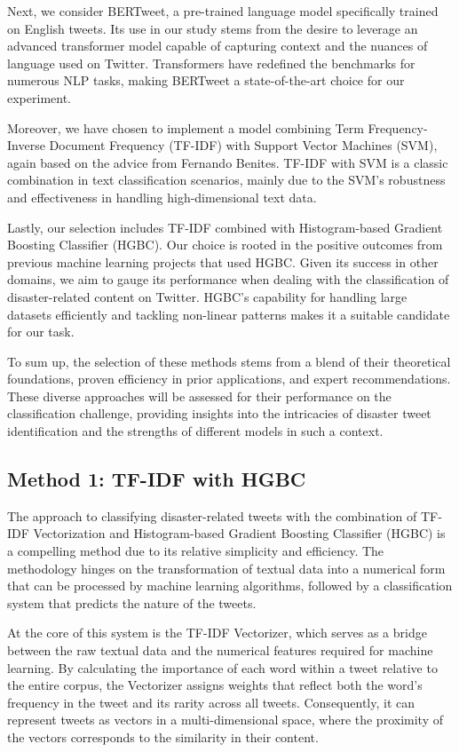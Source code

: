 \documentclass[10pt,table]{article}
\begin{document}
Next, we consider BERTweet, a pre-trained language model specifically trained on English tweets. Its use in our study stems from the desire to leverage an advanced transformer model capable of capturing context and the nuances of language used on Twitter. Transformers have redefined the benchmarks for numerous NLP tasks, making BERTweet a state-of-the-art choice for our experiment.

Moreover, we have chosen to implement a model combining Term Frequency-Inverse Document Frequency (TF-IDF) with Support Vector Machines (SVM), again based on the advice from Fernando Benites. TF-IDF with SVM is a classic combination in text classification scenarios, mainly due to the SVM's robustness and effectiveness in handling high-dimensional text data.

Lastly, our selection includes TF-IDF combined with Histogram-based Gradient Boosting Classifier (HGBC). Our choice is rooted in the positive outcomes from previous machine learning projects that used HGBC. Given its success in other domains, we aim to gauge its performance when dealing with the classification of disaster-related content on Twitter. HGBC's capability for handling large datasets efficiently and tackling non-linear patterns makes it a suitable candidate for our task.

To sum up, the selection of these methods stems from a blend of their theoretical foundations, proven efficiency in prior applications, and expert recommendations. These diverse approaches will be assessed for their performance on the classification challenge, providing insights into the intricacies of disaster tweet identification and the strengths of different models in such a context.


\subsection{Method 1: TF-IDF with HGBC}
The approach to classifying disaster-related tweets with the combination of TF-IDF Vectorization and Histogram-based Gradient Boosting Classifier (HGBC) is a compelling method due to its relative simplicity and efficiency. The methodology hinges on the transformation of textual data into a numerical form that can be processed by machine learning algorithms, followed by a classification system that predicts the nature of the tweets.

At the core of this system is the TF-IDF Vectorizer, which serves as a bridge between the raw textual data and the numerical features required for machine learning. By calculating the importance of each word within a tweet relative to the entire corpus, the Vectorizer assigns weights that reflect both the word's frequency in the tweet and its rarity across all tweets. Consequently, it can represent tweets as vectors in a multi-dimensional space, where the proximity of the vectors corresponds to the similarity in their content.
\end{document}
